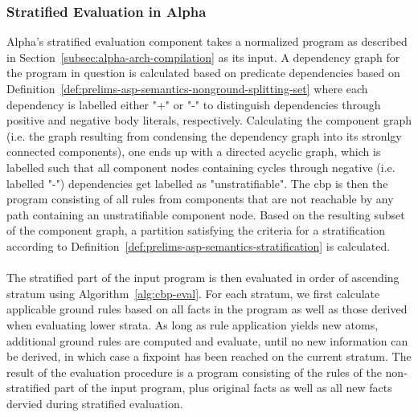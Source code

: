 \subsubsection{Stratified Evaluation in Alpha~\cite{partial-eval}}
\label{subsubsec:impl-stratified-eval}

Alpha's stratified evaluation component takes a normalized program as described in Section~\ref{subsec:alpha-arch-compilation} as its input. A dependency graph for the program in question is calculated based on predicate dependencies based on Definition~\ref{def:prelims-asp-semantics-nonground-splitting-set} where each dependency is labelled either "+" or "-" to distinguish dependencies through positive and negative body literals, respectively. Calculating the component graph (i.e. the graph resulting from condensing the dependency graph into its stronlgy connected components), one ends up with a directed acyclic graph, which is labelled such that all component nodes containing cycles through negative (i.e. labelled "-") dependencies get labelled as "unstratifiable". The \gls{cbp} is then the program consisting of all rules from components that are not reachable by any path containing an unstratifiable component node. Based on the resulting subset of the component graph, a partition satisfying the criteria for a stratification according to Definition~\ref{def:prelims-asp-semantics-stratification} is calculated.\\
\\
The stratified part of the input program is then evaluated in order of ascending stratum using Algorithm~\ref{alg:cbp-eval}. For each stratum, we first calculate applicable ground rules based on all facts in the program as well as those derived when evaluating lower strata. As long as rule application yields new atoms, additional ground rules are computed and evaluate, until no new information can be derived, in which case a fixpoint has been reached on the current stratum. The result of the evaluation procedure is a program consisting of the rules of the non-stratified part of the input program, plus original facts as well as all new facts dervied during stratified evaluation.


